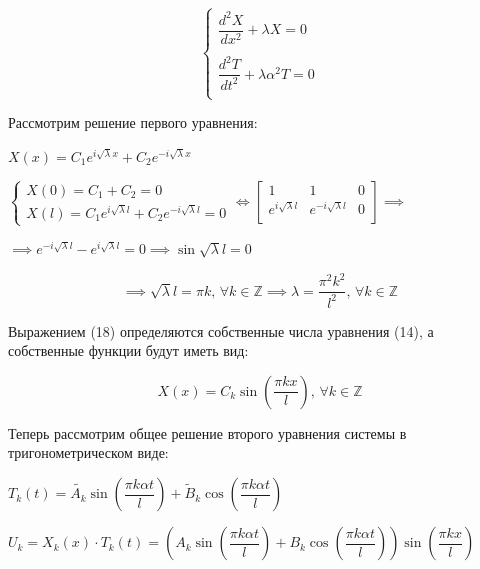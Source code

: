 \documentclass[a4paper, 12pt]{article}
\begin{document}
	\begin{equation}
		\begin{cases}
			\dfrac{d^2 X}{dx^2} + \lambda X = 0 \\
			\\
			\dfrac{d^2 T}{dt^2} + \lambda \alpha^2 T = 0 \\ 
		\end{cases}
	\end{equation}
	
	\quad Рассмотрим решение первого уравнения: 
	
	\begin{center}
		$X(x) = C_1 e^{i\sqrt{\lambda} x} + C_2 e^{-i\sqrt{\lambda}x} $
		
		$\begin{cases}
			X(0) = C_1 + C_2 = 0 \\
			X(l) = C_1 e^{i\sqrt{\lambda} l} + C_2 e^{-i\sqrt{\lambda} l} = 0
		\end{cases} \Leftrightarrow \left[ \begin{array}{cc|c}
			1 & 1 & 0 \\
			e^{i\sqrt{\lambda} l} & e^{-i\sqrt{\lambda}l} & 0 \\
		\end{array}\right] \implies$
		
		$\implies e^{-i\sqrt{\lambda}l} - e^{i\sqrt{\lambda}l} = 0 \implies \sin{\sqrt{\lambda} l} = 0$
		
	\end{center}
	
	\begin{equation}
		\implies \sqrt{\lambda} l = \pi k\text{, }\forall k \in \mathbb{Z} \implies \lambda = \dfrac{\pi^2 k^2}{l^2}\text{, }\forall k \in \mathbb{Z}
	\end{equation}
	
	\quad Выражением (18) определяются собственные числа уравнения (14), а собственные функции будут иметь вид: 
	
	\begin{equation}
		X(x) = C_k \sin\left( \dfrac{\pi k x}{l} \right)\text{, } \forall k \in \mathbb{Z} 
	\end{equation}
	
	\quad Теперь рассмотрим общее решение второго уравнения системы в тригонометрическом виде: 
	
	\begin{center}
		$T_k(t)  = \tilde{A_k} \sin\left(\dfrac{\pi k \alpha t}{l}\right) + \tilde B_k \cos\left(\dfrac{\pi k \alpha t}{l}\right)$
		
		$U_k = X_k(x) \cdot T_k (t) = \left(A_k \sin\left(\dfrac{\pi k \alpha t}{l}\right) + B_k \cos\left(\dfrac{\pi k \alpha t}{l}\right)\right)\sin\left(\dfrac{\pi k x}{l}\right) $
	\end{center}
	
\end{document}
